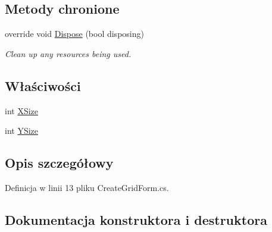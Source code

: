 \subsection*{Metody chronione}
\begin{DoxyCompactItemize}
\item 
override void \hyperlink{class_convay_1_1_win_forms_game_1_1_create_grid_form_ab7190b04f4d53236f132b7361f874f88}{Dispose} (bool disposing)
\begin{DoxyCompactList}\small\item\em Clean up any resources being used. \end{DoxyCompactList}\end{DoxyCompactItemize}
\subsection*{Właściwości}
\begin{DoxyCompactItemize}
\item 
int \hyperlink{class_convay_1_1_win_forms_game_1_1_create_grid_form_a020c69576703c0e6614d9acb0702b5ec}{X\+Size}
\item 
int \hyperlink{class_convay_1_1_win_forms_game_1_1_create_grid_form_aa4e0f8b3eaf92220006c3be2a24969c5}{Y\+Size}
\end{DoxyCompactItemize}


\subsection{Opis szczegółowy}


Definicja w linii 13 pliku Create\+Grid\+Form.\+cs.



\subsection{Dokumentacja konstruktora i destruktora}
\hypertarget{class_convay_1_1_win_forms_game_1_1_create_grid_form_aeaac1fac90b8f649ad0f8c83cd77248c}{}\label{class_convay_1_1_win_forms_game_1_1_create_grid_form_aeaac1fac90b8f649ad0f8c83cd77248c} 
